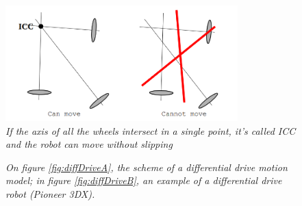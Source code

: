 \begin{figure}
	\centering
	\includegraphics[width=0.8\textwidth]{Images/background_and_tools/icc.png}
	\caption{\textit{If the axis of all the wheels intersect in a single point, it's called ICC and the robot can move without slipping}}
	\label{fig:icc}
\end{figure}


\begin{figure}
	\centering
	\qquad
	\caption{\textit{On figure \ref{fig:diffDriveA}, the scheme of a differential drive motion model; in figure \ref{fig:diffDriveB}, an example of a differential drive robot (Pioneer 3DX).}}
	\label{fig:diffDrive}
\end{figure}

